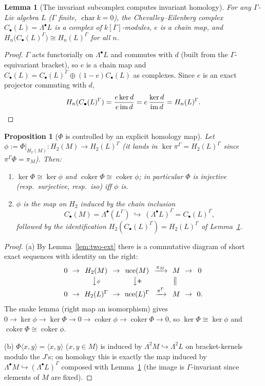 \documentclass{amsart}
\newtheorem{lemma}{Lemma}
\newtheorem{proposition}{Proposition}
\theoremstyle{definition}
\DeclareMathOperator{\uce}{uce}
\DeclareMathOperator{\im}{im}
\newcommand{\Gm}{\Gamma}
\newcommand{\ra}{\rightarrow}
\begin{document}
\begin{lemma}[The invariant subcomplex computes invariant homology]
\label{lem:invariant-complex}
For any $\Gm$-Lie algebra $L$ ($\Gm$ finite, $\operatorname{char}k=0$), the
Chevalley--Eilenberg complex $C_\bullet(L)=\Lambda^\bullet L$ is a complex of
$k[\Gm]$-modules, $e$ is a chain map, and
$H_n\bigl(C_\bullet(L)^{\Gm}\bigr)\cong H_n(L)^{\Gm}$ for all $n$.
\end{lemma}
\begin{proof}
$\Gm$ acts functorially on $\Lambda^\bullet L$ and commutes with $d$ (built from
the $\Gm$-equivariant bracket), so $e$ is a chain map and $C_\bullet(L)=
C_\bullet(L)^{\Gm}\oplus(1-e)C_\bullet(L)$ as complexes.  Since $e$ is an exact
projector commuting with $d$,
\[
   H_n(C_\bullet(L)^{\Gm})=\frac{e\ker d}{e\im d}=e\,\frac{\ker d}{\im d}
   =H_n(L)^{\Gm}.\qedhere
\]
\end{proof}

\begin{proposition}[$\Phi$ is controlled by an explicit homology map]
\label{prop:snake}
Let $\phi:=\Phi|_{H_2(M)}\colon H_2(M)\ra H_2(L)^{\Gm}$ (it lands in
$\ker\pi^{\Gm}=H_2(L)^{\Gm}$ since $\pi^{\Gm}\Phi=\pi_M$).  Then:
\begin{enumerate}
\item[(a)] $\ker\Phi\cong\ker\phi$ and $\operatorname{coker}\Phi\cong
\operatorname{coker}\phi$; in particular $\Phi$ is injective (resp.\ surjective,
resp.\ iso) iff $\phi$ is.
\item[(b)] $\phi$ is the map on $H_2$ induced by the chain inclusion
\[
   C_\bullet(M)=\Lambda^\bullet(L^{\Gm})\ \hookrightarrow\ (\Lambda^\bullet L)^{\Gm}
   =C_\bullet(L)^{\Gm},
\]
followed by the identification $H_2(C_\bullet(L)^{\Gm})=H_2(L)^{\Gm}$ of
Lemma~\ref{lem:invariant-complex}.
\end{enumerate}
\end{proposition}
\begin{proof}
(a) By Lemma~\ref{lem:two-ext} there is a commutative diagram of short exact
sequences with identity on the right:
\[
\begin{array}{ccccccccc}
0 &\!\!\ra\!\!& H_2(M) &\!\!\ra\!\!& \uce(M) &\!\!\xrightarrow{\pi_M}\!\!& M &\!\!\ra\!\!& 0\\[2pt]
  &   & \big\downarrow{\scriptstyle\phi} & & \big\downarrow{\scriptstyle\Phi} & & \big\|\ & & \\[2pt]
0 &\!\!\ra\!\!& H_2(L)^{\Gm} &\!\!\ra\!\!& \uce(L)^{\Gm} &\!\!\xrightarrow{\pi^{\Gm}}\!\!& M &\!\!\ra\!\!& 0.
\end{array}
\]
The snake lemma (right map an isomorphism) gives
$0\ra\ker\phi\ra\ker\Phi\ra0\ra\operatorname{coker}\phi\ra
\operatorname{coker}\Phi\ra0$, so $\ker\Phi\cong\ker\phi$ and
$\operatorname{coker}\Phi\cong\operatorname{coker}\phi$.

(b) $\Phi\langle x,y\rangle=\langle x,y\rangle$ ($x,y\in M$) is induced by
$\Lambda^2M\hookrightarrow\Lambda^2L$ on bracket-kernels modulo the $J$'s; on
homology this is exactly the map induced by $\Lambda^\bullet M\hookrightarrow
(\Lambda^\bullet L)^{\Gm}$ composed with Lemma~\ref{lem:invariant-complex} (the
image is $\Gm$-invariant since elements of $M$ are fixed).
\end{proof}
\end{document}
